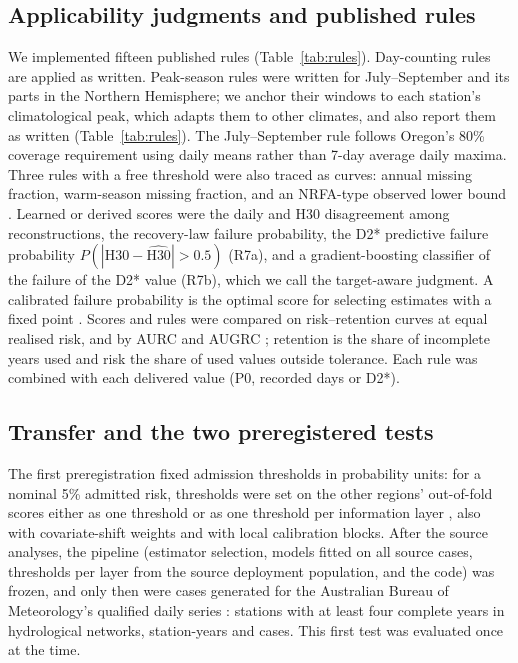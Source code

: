 \documentclass[draft]{agujournal2025}
\begin{document}
\subsection{Applicability judgments and published rules}
We implemented fifteen published rules (Table~\ref{tab:rules}). Day-counting rules are applied as written. Peak-season rules were written for July--September and its parts in the Northern Hemisphere; we anchor their windows to each station's climatological peak, which adapts them to other climates, and also report them as written (Table~\ref{tab:rules}). The July--September rule follows Oregon's 80\% coverage requirement using daily means rather than 7-day average daily maxima. Three rules with a free threshold were also traced as curves: annual missing fraction, warm-season missing fraction, and an NRFA-type observed lower bound \cite{nrfa2026}. Learned or derived scores were the daily and H30 disagreement among reconstructions, the recovery-law failure probability, the D2* predictive failure probability $P(|\mathrm{H30}-\hat{\mathrm{H30}}|>0.5)$ (R7a), and a gradient-boosting classifier of the failure of the D2* value (R7b), which we call the target-aware judgment. A calibrated failure probability is the optimal score for selecting estimates with a fixed point \cite{chow1970,franc2023}. Scores and rules were compared on risk--retention curves at equal realised risk, and by AURC and AUGRC \cite{geifman2017,traub2024}; retention is the share of incomplete years used and risk the share of used values outside tolerance. Each rule was combined with each delivered value (P0, recorded days or D2*).

\subsection{Transfer and the two preregistered tests}
\label{sec:tests}
The first preregistration fixed admission thresholds in probability units: for a nominal 5\% admitted risk, thresholds were set on the other regions' out-of-fold scores either as one threshold or as one threshold per information layer \cite{vovk2005}, also with covariate-shift weights \cite{tibshirani2019} and with local calibration blocks. After the source analyses, the pipeline (estimator selection, models fitted on all source cases, thresholds per layer from the source deployment population, and the code) was frozen, and only then were cases generated for the Australian Bureau of Meteorology's qualified daily series \cite{bom2026}: \TAuStations{} stations with at least four complete years in \TAuNetworks{} hydrological networks, \TAuYears{} station-years and \TAuCases{} cases. This first test was evaluated once at the time.
\end{document}
